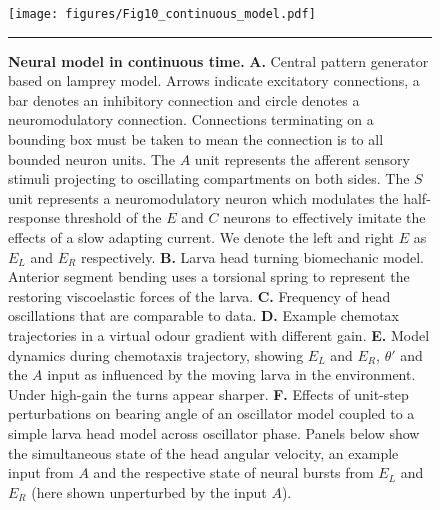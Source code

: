 \documentclass[11pt,a4paper]{article}
\newcommand{\todoBW}[1]{\todo[author=BW,color=orange, size=\tiny,inline]{#1}}
\begin{document}
\begin{figure}
\begin{center}
\texttt{[image: figures/Fig10\_continuous\_model.pdf]}
\caption{{\bf Neural model in continuous time.} {\bf A.} Central pattern generator based on lamprey model. Arrows indicate excitatory connections, a bar denotes an inhibitory connection and circle denotes a neuromodulatory connection. Connections terminating on a bounding box must be taken to mean the connection is to all bounded neuron units. The $A$ unit represents the afferent sensory stimuli projecting to oscillating compartments on both sides. The $S$ unit represents a neuromodulatory neuron which  modulates the half-response threshold of the $E$ and $C$ neurons \cite[see]{wilson1999spikes} to effectively imitate the effects of a slow adapting current. We denote the left and right $E$ as $E_L$ and $E_R$ respectively.
{\bf B.} Larva head turning biomechanic model. Anterior segment bending uses a torsional spring to represent the restoring viscoelastic forces of the larva.
{\bf C.} Frequency of head oscillations that are comparable to data.
{\bf D.} Example chemotax trajectories in a virtual odour gradient with different gain.
{\bf E.} Model dynamics during chemotaxis trajectory, showing $E_L$ and  $E_R$, $\theta'$ and the $A$ input as influenced by the moving larva in the environment. Under high-gain the turns appear sharper.
{\bf F.} Effects of unit-step perturbations on bearing angle of an oscillator model coupled to a simple larva head model across oscillator phase. Panels below show the simultaneous state of the head angular velocity, an example input from $A$ and the respective state of neural bursts from $E_L$ and $E_R$ (here shown unperturbed by the input $A$).
\label{fig:LampreyModel}}
\hrule
\end{center}
\end{figure}
\end{document}
